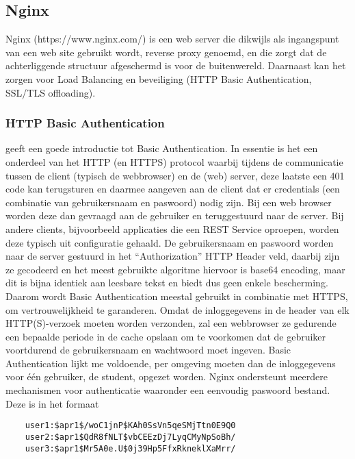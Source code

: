 \subsection{Nginx}
Nginx (https://www.nginx.com/) is een web server die dikwijls als ingangspunt van een web site gebruikt wordt, reverse proxy genoemd, en die zorgt dat de achterliggende structuur afgeschermd is voor de buitenwereld. Daarnaast kan het zorgen voor Load Balancing en beveiliging (HTTP Basic Authentication, SSL/TLS offloading).



\subsubsection{HTTP Basic Authentication}
\textcite{Mozilla2023} geeft een goede introductie tot Basic Authentication.
In essentie is het een onderdeel van het HTTP (en HTTPS) protocol waarbij tijdens de communicatie tussen de client (typisch de webbrowser) en de (web) server, deze laatste een 401 code kan terugsturen en daarmee aangeven aan de client dat er credentials (een combinatie van gebruikersnaam en paswoord) nodig zijn. Bij een web browser worden deze dan gevraagd aan de gebruiker en teruggestuurd naar de server. Bij andere clients, bijvoorbeeld applicaties die een REST Service oproepen, worden deze typisch uit configuratie gehaald.
De gebruikersnaam en paswoord worden naar de server gestuurd in het ``Authorization'' HTTP Header veld, daarbij zijn ze gecodeerd en het meest gebruikte algoritme hiervoor is base64 encoding, maar dit is bijna identiek aan leesbare tekst en biedt dus geen enkele bescherming. Daarom wordt Basic Authentication meestal gebruikt in combinatie met HTTPS, om vertrouwelijkheid te garanderen.
\newline
Omdat de inloggegevens in de header van elk HTTP(S)-verzoek moeten worden verzonden, zal een webbrowser ze gedurende een bepaalde periode in de cache opslaan om te voorkomen dat de gebruiker voortdurend de gebruikersnaam en wachtwoord moet ingeven.
\newline
\newline
Basic Authentication lijkt me voldoende, per omgeving moeten dan de inloggegevens voor \'e\'en gebruiker, de student, opgezet worden. Nginx ondersteunt meerdere mechanismen voor authenticatie waaronder een eenvoudig paswoord bestand. Deze is in het formaat
\newline
\newline
\begin{lstlisting}
    user1:$apr1$/woC1jnP$KAh0SsVn5qeSMjTtn0E9Q0
    user2:$apr1$QdR8fNLT$vbCEEzDj7LyqCMyNpSoBh/
    user3:$apr1$Mr5A0e.U$0j39Hp5FfxRkneklXaMrr/ 
\end{lstlisting}


